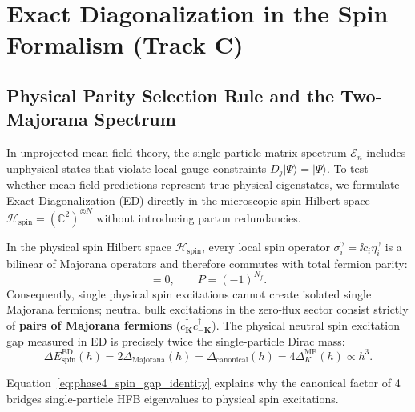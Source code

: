 \chapter{Exact Diagonalization in the Spin Formalism (Track C)}
\label{ch:phase4_ed}

\section{Physical Parity Selection Rule and the Two-Majorana Spectrum}
\label{sec:phase4_ed_selection_rule}

In unprojected mean-field theory, the single-particle matrix spectrum $\mathcal{E}_n$ includes unphysical states that violate local gauge constraints $D_j |\Psi\rangle = |\Psi\rangle$. To test whether mean-field predictions represent true physical eigenstates, we formulate Exact Diagonalization (ED) directly in the microscopic spin Hilbert space $\mathcal{H}_{\mathrm{spin}} = (\mathbb{C}^2)^{\otimes N}$ without introducing parton redundancies.

\begin{theorem}
\label{thm:phase4_two_majorana}
In the physical spin Hilbert space $\mathcal{H}_{\mathrm{spin}}$, every local spin operator $\sigma_i^\gamma = \ii c_i \eta_i^\gamma$ is a bilinear of Majorana operators and therefore commutes with total fermion parity:
\begin{equation}
[P, \sigma_i^\gamma] = 0, \qquad P = (-1)^{N_f}.
\end{equation}
Consequently, single physical spin excitations cannot create isolated single Majorana fermions; neutral bulk excitations in the zero-flux sector consist strictly of \textbf{pairs of Majorana fermions} ($c_{\mathbf{K}}^\dagger c_{-\mathbf{K}}^\dagger$).
The physical neutral spin excitation gap measured in ED is precisely twice the single-particle Dirac mass:
\begin{equation}
\label{eq:phase4_spin_gap_identity}
\boxed{\Delta E_{\mathrm{spin}}^{\mathrm{ED}}(h) = 2 \Delta_{\mathrm{Majorana}}(h) = \Delta_{\mathrm{canonical}}(h) = 4 \Delta_K^{\mathrm{MF}}(h) \propto h^3.}
\end{equation}
\end{theorem}
Equation~\eqref{eq:phase4_spin_gap_identity} explains why the canonical factor of 4 bridges single-particle HFB eigenvalues to physical spin excitations.

